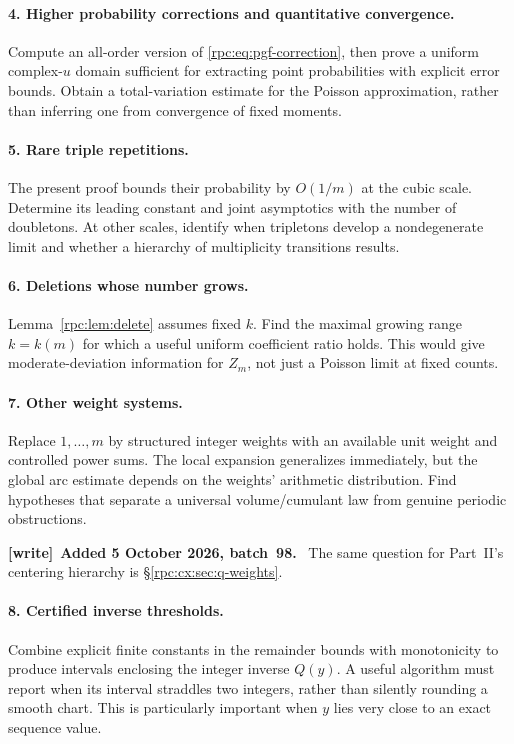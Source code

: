 \documentclass[11pt]{article}
\theoremstyle{definition}
\theoremstyle{remark}
\numberwithin{equation}{section}
\newenvironment{writenote}[1][]{\par\smallskip\begingroup\small
 \noindent\textbf{[write]}\if\relax\detokenize{#1}\relax\else~\textbf{#1.}\fi\ }%
 {\par\endgroup\smallskip}
\begin{document}
\paragraph{4. Higher probability corrections and quantitative convergence.}
Compute an all-order version of \eqref{rpc:eq:pgf-correction}, then prove a
uniform complex-$u$ domain sufficient for extracting point probabilities
with explicit error bounds. Obtain a total-variation estimate for the Poisson
approximation, rather than inferring one from convergence of fixed moments.

\paragraph{5. Rare triple repetitions.}
The present proof bounds their probability by $O(1/m)$ at the cubic scale.
Determine its leading constant and joint asymptotics with the number of
doubletons. At other scales, identify when tripletons develop a nondegenerate
limit and whether a hierarchy of multiplicity transitions results.

\paragraph{6. Deletions whose number grows.}
Lemma~\ref{rpc:lem:delete} assumes fixed $k$. Find the maximal growing range
$k=k(m)$ for which a useful uniform coefficient ratio holds. This would give
moderate-deviation information for $Z_m$, not just a Poisson limit at fixed
counts.

\paragraph{7. Other weight systems.}
Replace $1,\ldots,m$ by structured integer weights with an available unit
weight and controlled power sums. The local expansion generalizes immediately,
but the global arc estimate depends on the weights' arithmetic distribution.
Find hypotheses that separate a universal volume/cumulant law from genuine
periodic obstructions.

\begin{writenote}[Added 5 October 2026, batch~98]
The same question for Part~II's centering hierarchy is
\S\ref{rpc:cx:sec:q-weights}.
\end{writenote}

\paragraph{8. Certified inverse thresholds.}
Combine explicit finite constants in the remainder bounds with monotonicity
to produce intervals enclosing the integer inverse $Q(y)$. A useful algorithm
must report when its interval straddles two integers, rather than silently
rounding a smooth chart. This is particularly important when $y$ lies very
close to an exact sequence value.
\end{document}
